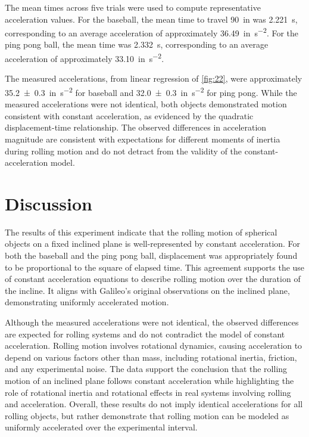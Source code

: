 \documentclass[reprint,amsmath,amssymb,aps,twoside]{revtex4-2}
\begin{document}
The mean times across five trials were used to compute representative acceleration values. For the baseball, the mean time to travel \qty{90}{in} was \qty{2.221}{\second}, corresponding to an average acceleration of approximately \qty{36.49}{in\per\second\squared}. For the ping pong ball, the mean time was \qty{2.332}{\second}, corresponding to an average acceleration of approximately \qty{33.10}{in\per\second\squared}. 

The measured accelerations, from linear regression of \cref{fig:22}, were approximately \qty{35.2\pm0.3}{in\per\second\squared} for baseball and \qty{32.0\pm0.3}{in\per\second\squared} for ping pong. %
 While the measured accelerations were not identical, both objects demonstrated motion consistent with constant acceleration, as evidenced by the quadratic displacement-time relationship. The observed differences in acceleration magnitude are consistent with expectations for different moments of inertia during rolling motion and do not detract from the validity of the constant-acceleration model.






\section{Discussion}
The results of this experiment indicate that the rolling motion of spherical objects on a fixed inclined plane is well-represented by constant acceleration. For both the baseball and the ping pong ball, displacement was appropriately found to be proportional to the square of elapsed time. This agreement supports the use of constant acceleration equations to describe rolling motion over the duration of the incline. It aligns with Galileo’s original observations on the inclined plane, demonstrating uniformly accelerated motion.

Although the measured accelerations were not identical, the observed differences are expected for rolling systems and do not contradict the model of constant acceleration. Rolling motion involves rotational dynamics, causing acceleration to depend on various factors other than mass, including rotational inertia, friction, and any experimental noise. The data support the conclusion that the rolling motion of an inclined plane follows constant acceleration while highlighting the role of rotational inertia and rotational effects in real systems involving rolling and acceleration. Overall, these results do not imply identical accelerations for all rolling objects, but rather demonstrate that rolling motion can be modeled as uniformly accelerated over the experimental interval.
\end{document}
